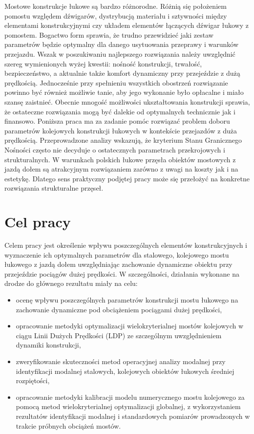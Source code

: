 Mostowe konstrukcje łukowe są bardzo różnorodne. Różnią się położeniem pomostu względem dźwigarów, dystrybucją materiału i sztywności między elementami konstrukcyjnymi czy układem elementów łączących dźwigar łukowy z pomostem. Bogactwo form sprawia, że trudno przewidzieć jaki zestaw parametrów będzie optymalny dla danego usytuowania przeprawy i warunków przejazdu. Wszak w poszukiwaniu najlepszego rozwiązania należy uwzględnić szereg wymienionych wyżej kwestii: nośność konstrukcji, trwałość, bezpieczeństwo, a aktualnie także komfort dynamiczny przy przejeździe z dużą prędkością. Jednocześnie przy spełnieniu wszystkich obostrzeń rozwiązanie powinno być również możliwie tanie, aby jego wykonanie było opłacalne i miało szansę zaistnieć. Obecnie mnogość możliwości ukształtowania konstrukcji sprawia, że ostateczne rozwiązania mogą być dalekie od optymalnych technicznie jak i finansowo. Poniższa praca ma za zadanie pomóc rozwiązać problem doboru parametrów kolejowych konstrukcji łukowych w kontekście przejazdów z duża prędkością. Przeprowadzone analizy wskazują, że kryterium Stanu Granicznego Nośności często nie decyduje o ostatecznych parametrach przekrojowych i strukturalnych. W warunkach polskich łukowe przęsła obiektów mostowych z jazdą dołem są atrakcyjnym rozwiązaniem zarówno z uwagi na koszty jak i na estetykę. Dlatego sens praktyczny podjętej pracy może się przełożyć na konkretne rozwiązania strukturalne przęseł.


\section*{Cel pracy}
Celem pracy jest określenie wpływu poszczególnych elementów konstrukcyjnych i wyznaczenie ich optymalnych parametrów dla stalowego, kolejowego mostu łukowego z jazdą dołem uwzględniając zachowanie dynamiczne obiektu przy przejeździe pociągów dużej prędkości.
W szczególności, działania wykonane na drodze do głównego rezultatu miały na celu:
\begin{itemize}
	\item ocenę wpływu poszczególnych parametrów konstrukcji mostu łukowego na zachowanie dynamiczne pod obciążeniem pociągami dużej prędkości,
	\item opracowanie metodyki optymalizacji wielokryterialnej mostów kolejowych w ciągu Linii Dużych Prędkości (LDP) ze szczególnym uwzględnieniem dynamiki konstrukcji,
	\item zweryfikowanie skuteczności metod operacyjnej analizy modalnej przy identyfikacji modalnej stalowych, kolejowych obiektów łukowych średniej rozpiętości,
	\item opracowanie metodyki kalibracji modelu numerycznego mostu kolejowego za pomocą metod wielokryterialnej optymalizacji globalnej, z wykorzystaniem rezultatów identyfikacji modalnej i standardowych pomiarów prowadzonych w trakcie próbnych obciążeń mostów.


\end{itemize}



